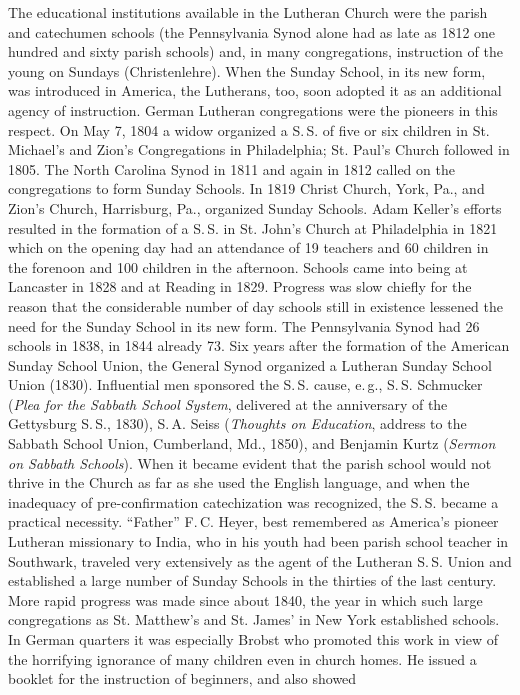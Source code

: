 The educational institutions available in the Lutheran Church were the parish and catechumen schools (the Pennsylvania Synod alone had as late as 1812 one hundred and sixty parish schools) and, in many congregations, instruction of the young on Sundays (Christenlehre). When the Sunday School, in its new form, was introduced in America, the Lutherans, too, soon adopted it as an additional agency of instruction. German Lutheran congregations were the pioneers in this respect. On May 7, 1804 a widow organized a S.\,S. of five or six children in St. Michael’s and Zion’s Congregations in Philadelphia; St. Paul’s Church followed in 1805. The North Carolina Synod in 1811 and again in 1812 called on the congregations to form Sunday Schools.
In 1819 Christ Church, York, Pa., and Zion’s Church, Harrisburg, Pa., organized Sunday Schools. Adam Keller’s efforts resulted in the formation of a S.\,S. in St. John’s Church at Philadelphia in 1821 which on the opening day had an attendance of 19 teachers and 60 children in the forenoon and 100 children in the afternoon. Schools came into being at Lancaster in 1828 and at Reading in 1829. Progress was slow chiefly for the reason that the considerable number of day schools still in existence lessened the need for the Sunday School in its new form. The Pennsylvania Synod had 26 schools in 1838, in 1844 already 73. Six years after the formation of the American Sunday School Union, the General Synod organized a Lutheran Sunday School Union (1830). Influential men sponsored the S.\,S. cause, e.\,g., S.\,S. Schmucker (\emph{Plea for the Sabbath School System}, delivered at the anniversary of the Gettysburg S.\,S., 1830), S.\,A. Seiss (\emph{Thoughts on Education}, address to the Sabbath School Union, Cumberland, Md., 1850), and Benjamin Kurtz (\emph{Sermon on Sabbath Schools}). When it became evident that the parish school would not thrive in the Church as far as she used the English language, and when the inadequacy of pre-confirmation catechization was recognized, the S.\,S. became a practical necessity. “Father” F.\,C. Heyer, best remembered as America’s pioneer Lutheran missionary to India, who in his youth had been parish school teacher in Southwark, traveled very extensively as the agent of the Lutheran S.\,S. Union and established a large number of Sunday Schools in the thirties of the last century. More rapid progress was made since about 1840, the year in which such large congregations as St. Matthew’s and St. James’ in New York established schools. In German quarters it was especially Brobst who promoted this work in view of the horrifying ignorance of many children even in church homes. He issued a booklet for the instruction of beginners, and also showed
